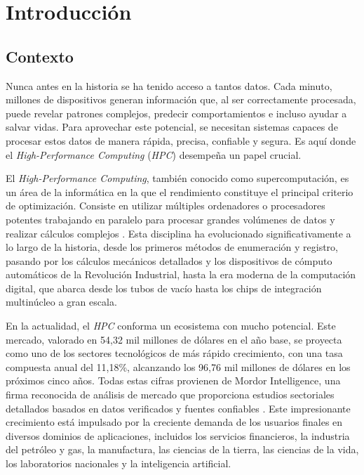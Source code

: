 \chapter{Introducción}

\section{Contexto}
Nunca antes en la historia se ha tenido acceso a tantos datos. Cada minuto, millones de dispositivos generan información que, al ser correctamente procesada, puede revelar patrones complejos, predecir comportamientos e incluso ayudar a salvar vidas. Para aprovechar este potencial, se necesitan sistemas capaces de procesar estos datos de manera rápida, precisa, confiable y segura. Es aquí donde el \textit{High-Performance Computing} (\textit{HPC}) desempeña un papel crucial.

El \textit{High-Performance Computing}, también conocido como supercomputación, es un área de la informática en la que el rendimiento constituye el principal criterio de optimización. Consiste en utilizar múltiples ordenadores o procesadores potentes trabajando en paralelo para procesar grandes volúmenes de datos y realizar cálculos complejos \cite{ref1}. Esta disciplina ha evolucionado significativamente a lo largo de la historia, desde los primeros métodos de enumeración y registro, pasando por los cálculos mecánicos detallados y los dispositivos de cómputo automáticos de la Revolución Industrial, hasta la era moderna de la computación digital, que abarca desde los tubos de vacío hasta los chips de integración multinúcleo a gran escala.

En la actualidad, el \textit{HPC} conforma un ecosistema con mucho potencial. Este mercado, valorado en 54,32 mil millones de dólares en el año base, se proyecta como uno de los sectores tecnológicos de más rápido crecimiento, con una tasa compuesta anual del 11,18\%, alcanzando los 96,76 mil millones de dólares en los próximos cinco años. Todas estas cifras provienen de Mordor Intelligence, una firma reconocida de análisis de mercado que proporciona estudios sectoriales detallados basados en datos verificados y fuentes confiables \cite{ref2}. Este impresionante crecimiento está impulsado por la creciente demanda de los usuarios finales en diversos dominios de aplicaciones, incluidos los servicios financieros, la industria del petróleo y gas, la manufactura, las ciencias de la tierra, las ciencias de la vida, los laboratorios nacionales y la inteligencia artificial.

